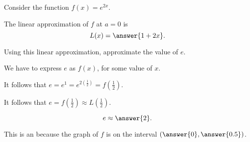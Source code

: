 \documentclass{ximera}
\author{Nela Lakos \and Kyle Parsons \and Bobby Ramsey}
\begin{document}
\begin{exercise}

Consider the function $f(x) = e^{2x}$.

The linear approximation of $f$ at $a=0$ is 
\[
L(x) = \answer{1+2x }.
\]

Using this linear approximation, approximate the value of $e$.
\begin{hint}
We have to express $e$ as $f(x)$, for some value of $x$.
\end{hint}
\begin{hint}
It follows that $e=e^1=e^{2(\frac{1}{2})}=f\left(\frac{1}{2}\right)$.
\end{hint}
\begin{hint}
It follows that $e=f\left(\frac{1}{2}\right)\approx L(\frac{1}{2})$.
\end{hint}
\[
e \approx \answer{2}.
\]

This is an
because the graph of $f$ is 
on the interval $\left( \answer{0}, \answer{0.5} \right)$.

\end{exercise}
\end{document}
